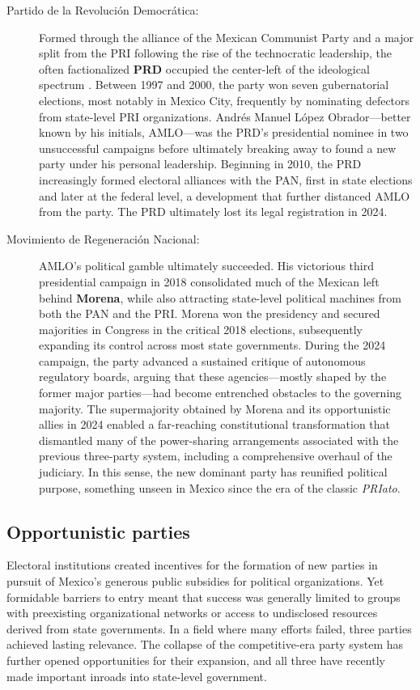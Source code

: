 \documentclass[letter,12pt]{article}
\begin{document}
\begin{description}
\item[Partido de la Revolución Democrática:] Formed through the alliance of the Mexican Communist Party and a major split from the PRI following the rise of the technocratic leadership, the often factionalized \textbf{PRD} occupied the center-left of the ideological spectrum \citep{bruhn.1997, cantuCSG2019apsr, ozlerPrd2009}. Between 1997 and 2000, the party won seven gubernatorial elections, most notably in Mexico City, frequently by nominating defectors from state-level PRI organizations. Andrés Manuel López Obrador---better known by his initials, AMLO---was the PRD's presidential nominee in two unsuccessful campaigns before ultimately breaking away to found a new party under his personal leadership. Beginning in 2010, the PRD increasingly formed electoral alliances with the PAN, first in state elections and later at the federal level, a development that further distanced AMLO from the party. The PRD ultimately lost its legal registration in 2024.

\item[Movimiento de Regeneración Nacional:] AMLO's political gamble ultimately succeeded. His victorious third presidential campaign in 2018 consolidated much of the Mexican left behind \textbf{Morena}, while also attracting state-level political machines from both the PAN and the PRI. Morena won the presidency and secured majorities in Congress in the critical 2018 elections, subsequently expanding its control across most state governments. During the 2024 campaign, the party advanced a sustained critique of autonomous regulatory boards, arguing that these agencies---mostly shaped by the former major parties---had become entrenched obstacles to the governing majority. The supermajority obtained by Morena and its opportunistic allies in 2024 enabled a far-reaching constitutional transformation that dismantled many of the power-sharing arrangements associated with the previous three-party system, including a comprehensive overhaul of the judiciary. In this sense, the new dominant party has reunified political purpose, something unseen in Mexico since the era of the classic \emph{PRIato}.
  
\end{description}

\subsection{Opportunistic parties}

Electoral institutions created incentives for the formation of new parties in pursuit of Mexico's generous public subsidies for political organizations. Yet formidable barriers to entry meant that success was generally limited to groups with preexisting organizational networks or access to undisclosed resources derived from state governments. In a field where many efforts failed, three parties achieved lasting relevance. The collapse of the competitive-era party system has further opened opportunities for their expansion, and all three have recently made important inroads into state-level government.
\end{document}
